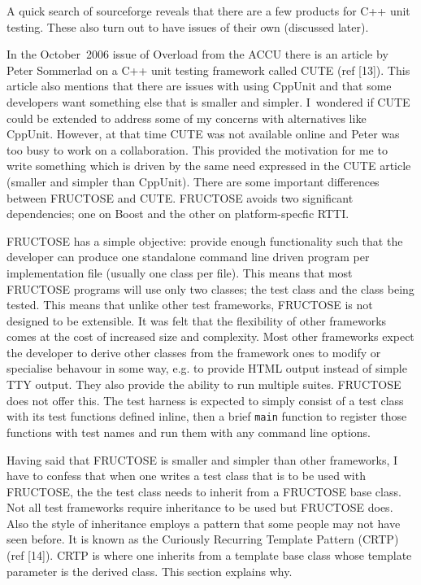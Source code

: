 \documentclass{book}
\begin{document}
A quick search of sourceforge reveals that there are a few products
for C++ unit testing. These also turn out to have issues of their own
(discussed later).

In the October~2006 issue of Overload from the ACCU there is an
article by Peter Sommerlad on a C++ unit testing framework called CUTE
(ref [13]).  This article also mentions that there are issues with
using CppUnit and that some developers want something else that is
smaller and simpler.  I~wondered if CUTE could be extended to address
some of my concerns with alternatives like CppUnit. However, at that
time CUTE was not available online and Peter was too busy to work on a
collaboration.  This provided the motivation for me to write something
which is driven by the same need expressed in the CUTE article
(smaller and simpler than CppUnit).  There are some important
differences between FRUCTOSE and CUTE.  FRUCTOSE avoids two
significant dependencies; one on Boost and the other on
platform-specfic RTTI.


FRUCTOSE has a simple objective: provide enough functionality such that the
developer can produce one standalone command line driven program per
implementation file (usually one class per file). This means that most
FRUCTOSE programs will use only two classes; the test class and the class
being tested. This means that unlike other test frameworks, FRUCTOSE is not
designed to be extensible.  It was felt that the flexibility of other
frameworks comes at the cost of increased size and complexity. Most other
frameworks expect the developer to derive other classes from the framework
ones to modify or specialise behavour in some way, e.g. to provide HTML output
instead of simple TTY output. They also provide the ability to run multiple
suites. FRUCTOSE does not offer this. The test harness is expected to simply
consist of a test class with its test functions defined inline, then a brief
{\tt main} function to register those functions with test names and run them
with any command line options.


Having said that FRUCTOSE is smaller and simpler than other frameworks,
I have to confess that when one writes a test class that is to be used
with FRUCTOSE, the the test class needs to inherit from a FRUCTOSE base
class. Not all test frameworks require inheritance to be used but
FRUCTOSE does. Also the style of inheritance employs a pattern that
some people may not have seen before.
It is known as the Curiously Recurring Template
Pattern (CRTP) (ref [14]).  CRTP is where one inherits from a 
template base class whose template parameter is the derived class.
This section explains why.
\end{document}
